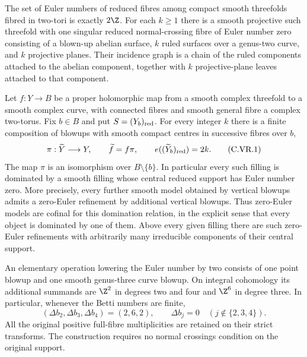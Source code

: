 \begin{proposition}\label{cdp:st:C.2.UN.2}

The set of Euler numbers of reduced fibres among compact smooth
threefolds fibred in two-tori is exactly $2\Z$. For each $k\ge1$
there is a smooth projective such threefold with one singular reduced
normal-crossing fibre of Euler number zero consisting of a blown-up
abelian surface, $k$ ruled surfaces over a genus-two curve, and $k$
projective planes. Their incidence graph is a chain of the ruled
components attached to the abelian component, together with $k$
projective-plane leaves attached to that component.
\end{proposition}

\begin{proposition}\label{cdp:st:C.2.UN.4}

Let $f:Y\to B$ be a proper holomorphic map from a smooth complex
threefold to a smooth complex curve, with connected fibres and smooth
general fibre a complex two-torus. Fix $b\in B$ and put
$S=(Y_b)_{\rm red}$. For every integer $k$ there is a finite composition
of blowups with smooth compact centres in successive fibres over $b$,
\[
 \pi:\widetilde Y\longrightarrow Y,\qquad
 \widetilde f=f\pi,\qquad
 e((\widetilde Y_b)_{\rm red})=2k.                 \tag{C.VR.1}\label{cdp:eq:C.VR.1}
\]
The map $\pi$ is an isomorphism over $B\setminus\{b\}$.
In particular every such filling is dominated by a smooth filling
whose central reduced support has Euler number zero. More precisely,
every further smooth model obtained by vertical blowups admits a
zero-Euler refinement by additional vertical blowups. Thus zero-Euler
models are cofinal for this domination relation, in the explicit sense
that every object is dominated by one of them.
Above every given filling there are such zero-Euler refinements with
arbitrarily many irreducible components of their central support.

An elementary operation lowering the Euler number by two consists of
one point blowup and one smooth genus-three curve blowup. On integral
cohomology its additional summands are $\Z^2$ in degrees two and four
and $\Z^6$ in degree three. In particular, whenever the Betti numbers
are finite,
\[
 (\Delta b_2,\Delta b_3,\Delta b_4)=(2,6,2),
 \qquad \Delta b_j=0\quad(j\notin\{2,3,4\}).       \tag{C.VR.2}\label{cdp:eq:C.VR.2}
\]
All the original positive full-fibre multiplicities are retained on
their strict transforms. The construction requires no normal crossings
condition on the original support.
\end{proposition}


